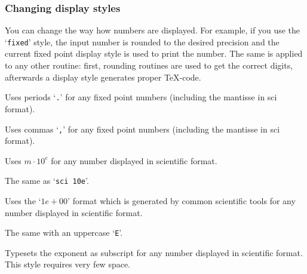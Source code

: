 \subsubsection{Changing display styles}%
\label{sec:number:styles}%
You can change the way how numbers are displayed. For example, if you use the `\texttt{fixed}' style, the input number is rounded to the desired precision and the current fixed point display style is used to print the number. The same is applied to any other routine: first, rounding routines are used to get the correct digits, afterwards a display style generates proper \TeX-code.

\begin{description}
\def\examplenumbers{12.346}%
\item[\texttt{use period}] Uses periods `\texttt{.}' for any fixed point numbers (including the mantisse in sci format).


\item[\texttt{use comma}] Uses commas `\texttt{,}' for any fixed point numbers (including the mantisse in sci format).



\item[\texttt{sci 10e}] Uses $m \cdot 10^e$ for any number displayed in scientific format.


\item[\texttt{sci 10\textasciicircum e}] The same as `\texttt{sci 10e}'.

\item[\texttt{sci e}] Uses the `$1e{+}00$' format which is generated by common scientific tools for any number displayed in scientific format.


\item[\texttt{sci E}] The same with an uppercase `\texttt{E}'.


\item[\texttt{sci subscript}] Typesets the exponent as subscript for any number displayed in scientific format. This style requires very few space.

\end{description}

